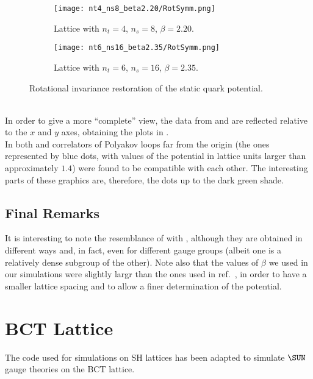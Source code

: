 \begin{figure}[!htbp]
    \centering
    \begin{subfigure}[b]{0.48\textwidth}
        \texttt{[image: nt4\_ns8\_beta2.20/RotSymm.png]}
        \caption{Lattice with $n_t=4$, $n_s=8$, $\beta=2.20$.}
        \label{4F:PotentialRestorationLargea}
    \end{subfigure}
    \begin{subfigure}[b]{0.48\textwidth}
        \texttt{[image: nt6\_ns16\_beta2.35/RotSymm.png]}
        \caption{Lattice with $n_t=6$, $n_s=16$, $\beta=2.35$.}
        \label{4F:PotentialRestorationSmalla}
    \end{subfigure}
    \caption{Rotational invariance restoration of the static quark potential.}
    \label{4F:PotentialRestoration}
\end{figure}\\
In order to give a more ``complete'' view, the data from  and  are reflected relative to the $x$ and $y$ axes, obtaining the plots in .\\
In both  and  correlators of Polyakov loops far from the origin (the ones represented by blue dots, with values of the potential in lattice units larger than approximately $1.4$) were found to be compatible with each other.
The interesting parts of these graphics are, therefore, the dots up to the dark green shade.

\subsection{Final Remarks}
It is interesting to note the resemblance of  with , although they are obtained in different ways and, in fact, even for different gauge groups (albeit one is a relatively dense subgroup of the other).
Note also that the values of $\beta$ we used in our simulations were slightly largr than the ones used in ref.~\cite{Lang:1982tj}, in order to have a smaller lattice spacing and to allow a finer determination of the potential.

\section{BCT Lattice}
The code used for simulations on SH lattices has been adapted to simulate $\SUN$ gauge theories on the BCT lattice.

